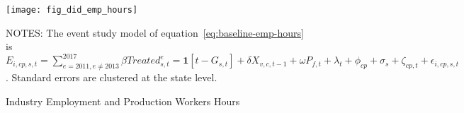 \begin{figure}[H]
    \centering
    \texttt{[image: fig\_did\_emp\_hours]}
    \caption{Industry Employment and Production Workers Hours}
    \label{fig:baseline-employment-hours}
    \begin{minipage}{12cm}
        \vspace{0.05in}
        NOTES: The event study model of equation~\ref{eq:baseline-emp-hours} is $E_{i,cp,s,t} = \sum_{{e = 2011},{e \neq 2013}}^{2017} \beta Treated_{s,t}^e = \textbf{1}[t - G_{s,t}] + \delta X_{v,c,t-1} + \omega P_{f,t} + \lambda_{t} + \phi_{cp} + \sigma_{s} + \zeta_{cp,t} + \epsilon_{i,cp,s,t}$. Standard errors are clustered at the state level.
    \end{minipage}
\end{figure}